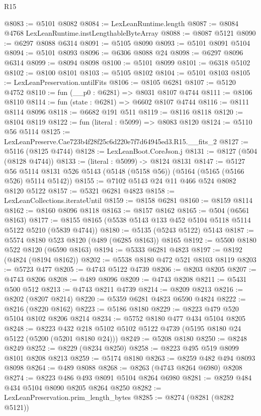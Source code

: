 \begin{lexlean}{R15}
\begin{coremodule}
{{{{{{{{{{{@8083 := @5101 @8082
@8084 := LexLeanRuntime.length
@8087 := @8084 @4768 LexLeanRuntime.instLengthableByteArray
@8088 := @8087 @5121
@8090 := @6297 @8088 @6314
@8091 := @5105 @8090
@8093 := @5101 @8091 @5104
@8094 := @5101 @8093
@8096 := @6306 @8088 @24
@8098 := @6297 @8096 @6314
@8099 := @8094 @8098
@8100 := @5101 @8099
@8101 := @6318 @5102
@8102 := @8100 @8101
@8103 := @5105 @8102
@8104 := @5101 @8103
@8105 := LexLeanPreservation.untilFits
@8106 := @8105 @6281
@8107 := @5120 @4752
@8110 := fun (__p0 : @6281) => @8031 @8107 @4744
@8111 := @8106 @8110
@8114 := fun (state : @6281) => @6602 @8107 @4744
@8116 := @8111 @8114 @8096
@8118 := @6682 @191 @511
@8119 := @8116 @8118
@8120 := @8104 @8119
@8122 := fun (literal : @5099) => @8083 @8120
@8124 := @5110 @56 @5114
@8125 := LexLeanPreserve.Cae723b4f28f25c6d220e7f7d64945ed3.R15.__fits_2
@8127 := @5116 (@8125 @4744)
@8128 := LexLeanBoot.CoreJson.j
@8131 := @8127 (@504 (@8128 @4744))
@8133 := (literal : @5099) -> @8124 @8131
@8147 := @5127
    @56
    @5114
    @8131
    @526
    @5143
    (@5148 (@5158 @56))
    (@5164 (@5165 (@5166 @526) @5114 @5142))
@8155 := @7102 @5143 @24 @11 @466 @524 @8082 @8120 @5122
@8157 := @5321 @6281 @4823
@8158 := LexLeanCollections.iterateUntil
@8159 := @8158 @6281
@8160 := @8159 @8114
@8162 := @8160 @8096 @8118
@8163 := @8157 @8162
@8165 := @504 (@6561 @8163)
@8177 := @8155 @8165 (@5538 @5143 @133 @452 @5104 @5118 @5114 @5122 @5210 (@5839 @4744))
@8180 := @5135 (@5243 @5122) @5143
@8187 := @5574 @8180 @523 @8120 (@489 (@6285 @8163)) @8165
@8192 := @5500 @8180 @522 @8120 (@6590 @8163)
@8194 := @5333 @6281 @4823
@8197 := @8192 (@4824 (@8194 @8162))
@8202 := @5538 @8180 @472 @521 @8103 @8119
@8203 := @5723 @477
@8205 := @4743 @5122 @4739
@8206 := @8203 @8205
@8207 := @4743 @8206
@8208 := @489 @8096
@8209 := @4743 @8208
@8211 := @5431 @500 @512
@8213 := @4743 @8211 @4739
@8214 := @8209 @8213
@8216 := @8202 (@8207 @8214)
@8220 := @5359 @6281 @4823 @6590 @4824
@8222 := @8216 (@8220 @8162)
@8223 := @5186 @8180
@8229 := @8223 @479 @520 @5104 @8102 @8206 @8214
@8234 := @5752 @8180 @477 @434 @5104 @8205
@8248 := @8223 @432 @218 @5102 @5102 @5122 @4739 (@5195 @8180 @24 @5122 (@5200 (@5201 @8180 @24)))
@8249 := @5208 @8180
@8250 := @8248 @8249
@8252 := @8229 (@8234 @8250)
@8258 := @8223 @495 @519 @8099 @8101 @8208 @8213
@8259 := @5174 @8180
@8263 := @8259 @482 @494 @8093 @8098
@8264 := @489 @8088
@8268 := @8263 (@4743 @8264 @6980) @8208
@8274 := @8223 @486 @493 @8091 @5104 @8264 @6980
@8281 := @8259 @484 @434 @5104 @8090 @8205 @8264 @8250
@8282 := LexLeanPreservation.prim_length_bytes
@8285 := @8274 (@8281 (@8282 @5121))
}}}}}}}}}}}
\end{coremodule}
\end{lexlean}
